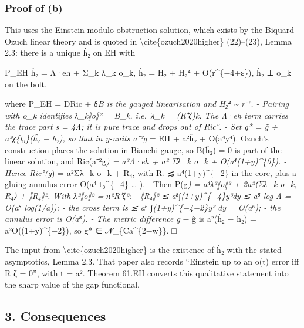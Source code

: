 \documentclass[
  10pt,
]{report}
\begin{document}
\hypertarget{proof-of-b}{%
\subsubsection{Proof of (b)}\label{proof-of-b}}

This uses the Einstein-modulo-obstruction solution, which exists by the
Biquard--Ozuch linear theory and is quoted in
\textbackslash cite\{ozuch2020higher\} (22)--(23), Lemma 2.3: there is a
unique ĥ₂ on EH with

P\_EH ĥ₂ = Λ·eh + Σ\_k λ\_k o\_k, ĥ₂ = H₂ + H₂⁴ + O(r\^{}\{−4+ε\}), ĥ₂ ⊥
o\_k on the bolt,

where P\_EH = DRic + δ\emph{B is the gauged linearisation and
\textbar H₂⁴\textbar{} \textasciitilde{} r⁻². - Pairing with o\_k
identifies λ\_k‖o‖² = B\_k, i.e.~λ\_k = (R⁺ζ)\emph{k. The Λ·eh term
carries the trace part s = 4Λ; it is pure trace and drops out of Ric°. -
Set g* = g̃ + a²χ}\{t₀\}(ĥ₂ − h₂), so that in y-units a⁻²g} = EH + a²ĥ₂ +
O(a⁴\textbar y\textbar⁴). Ozuch's construction places the solution in
Bianchi gauge, so B(ĥ₂) = 0 is part of the linear solution, and
Ric(a⁻²g\emph{) = a²Λ·eh + a² Σλ\_k o\_k +
O(a⁴(1+\textbar y\textbar)\^{}\{0\}). - Hence Ric°(g}) = a²Σλ\_k o\_k +
R₄, with \textbar R₄\textbar{} ≲ a⁴(1+\textbar y\textbar)\^{}\{−2\} in
the core, plus a gluing-annulus error O(a⁴ t₀\^{}\{−4\} \ldots{} ). -
Then P(g\emph{) = a⁴\textbar λ\textbar²‖o‖² + 2a²⟨Σλ\_k o\_k, R₄⟩ +
‖R₄‖². With \textbar λ\textbar²‖o‖² = π²\textbar R⁺ζ\textbar²: - ‖R₄‖² ≲
a⁸∫(1+\textbar y\textbar)\^{}\{−4\}\textbar y\textbar³dy ≲ a⁸ log Λ =
O(a⁸ log(1/a)); - the cross term is ≲ a⁶
∫(1+\textbar y\textbar)\^{}\{−4−2\}\textbar y\textbar³ dy = O(a⁶); - the
annulus error is O(a⁸). - The metric difference g} − g̃ is a²(ĥ₂ − h₂) =
a²O((1+\textbar y\textbar)\^{}\{−2\}), so g* ∈ 𝒩\_\{Ca\^{}\{2−w\}\}. □

The input from \textbackslash cite\{ozuch2020higher\} is the existence
of ĥ₂ with the stated asymptotics, Lemma 2.3. That paper also records
``Einstein up to an o(t) error iff R⁺ζ = 0'', with t = a². Theorem 61.EH
converts this qualitative statement into the sharp value of the gap
functional.

\hypertarget{consequences}{%
\subsection{3. Consequences}\label{consequences}}
\end{document}

